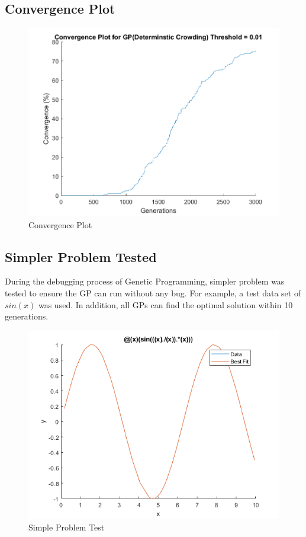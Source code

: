 \documentclass[12pt]{article}
\begin{document}
\subsection{Convergence Plot}
\begin{figure}[H]
	\centering
	\includegraphics[width=\textwidth]{convergencePlot}
	\caption[]%
	{{\small Convergence Plot}}    
\end{figure}
\newpage
\subsection{Simpler Problem Tested}
During the debugging process of Genetic Programming, simpler problem was tested to ensure the GP can run without any bug. For example, a test data set of $sin(x)$ was used. In addition, all GPs can find the optimal solution within 10 generations.
\begin{figure}[H]
	\centering
	\includegraphics[width=\textwidth]{simpleProblem}
	\caption[]%
	{{\small Simple Problem Test}}    
\end{figure}
\end{document}
